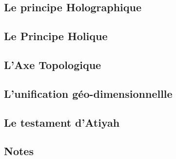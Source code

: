 \documentclass[a4paper,12pt]{article}
\begin{document}
\subsection{Le principe Holographique}
\subsection{Le Principe Holique}
\subsection{L'Axe Topologique}
\subsection{L'unification géo-dimensionnellle}
\subsection{Le testament d'Atiyah}




\subsection{Notes}
\end{document}
